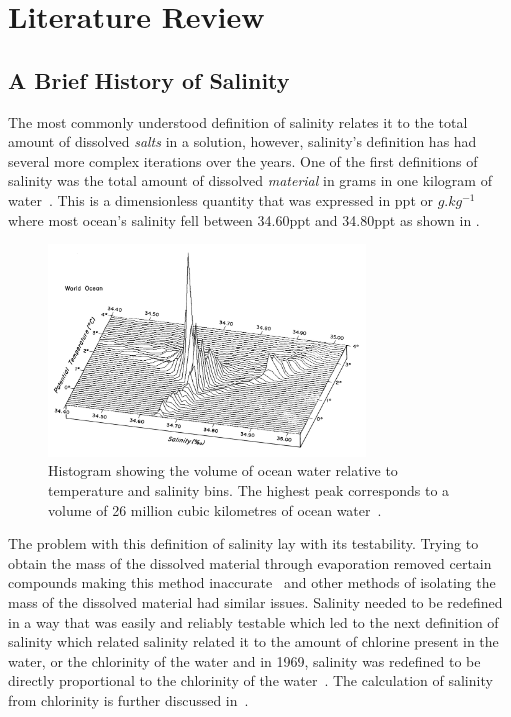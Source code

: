 
\chapter{Literature Review}\label{ch:literature}

\section{A Brief History of Salinity}\label{sec:a-brief-history-of-salinity}
The most commonly understood definition of salinity relates it to the total amount of dissolved \textit{salts} in a solution, however, salinity's definition has had several more complex iterations over the years.
One of the first definitions of salinity was the total amount of dissolved \textit{material} in grams in one kilogram of water~\cite{stewart_introduction_to_physical_oceanography_2004}.
This is a dimensionless quantity that was expressed in \gls{ppt} or $g.kg^{-1}$ where most ocean's salinity fell between 34.60\gls{ppt} and 34.80\gls{ppt} as shown in .
\begin{figure}[h]
    \centering
    \includegraphics[width=0.75\textwidth]{Figures/ocean_salinity_temperature_quantity}
    \caption{Histogram showing the volume of ocean water relative to temperature and salinity bins. The highest peak corresponds to a volume of 26 million cubic kilometres of ocean water~\cite{worthington_ocean_graphs_1981}.}
    \label{fig:ocean_salinity_temperature_quantity} %
\end{figure}\newline
The problem with this definition of salinity lay with its testability.
Trying to obtain the mass of the dissolved material through evaporation removed certain compounds making this method inaccurate~\cite{sverdrup_ocean_physics_and_chemistry_1942} and other methods of isolating the mass of the dissolved material had similar issues. 
Salinity needed to be redefined in a way that was easily and reliably testable which led to the next definition of salinity which related salinity related it to the amount of chlorine present in the water, or the chlorinity of the water and in 1969, salinity was redefined to be directly proportional to the chlorinity of the water~\cite{stewart_introduction_to_physical_oceanography_2004}.
The calculation of salinity from chlorinity is further discussed in~.

